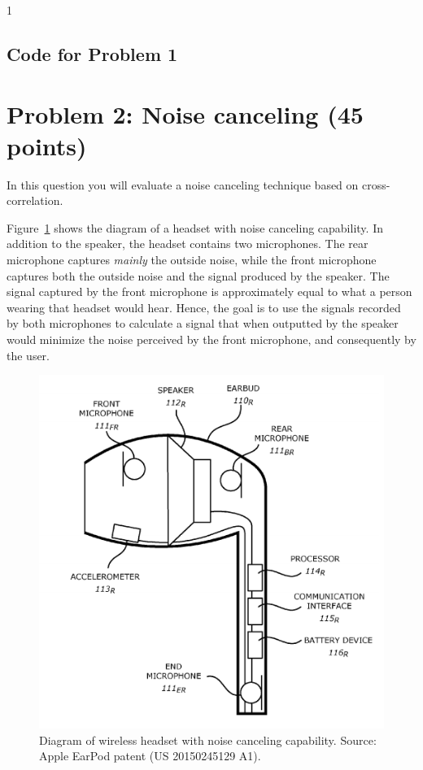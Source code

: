 \documentclass[10pt]{article}
\def\SOLUTIONS{1} %
\begin{document}
\if\SOLUTIONS1 
	\subsection*{Code for Problem 1}
	
\fi

\newpage
\section*{Problem 2: Noise canceling (45 points)}

In this question you will evaluate a noise canceling technique based on cross-correlation.

Figure~\ref{fig:earpod} shows the diagram of a headset with noise canceling capability. In addition to the speaker, the headset contains two microphones. The rear microphone captures \textit{mainly} the outside noise, while the front microphone captures both the outside noise and the signal produced by the speaker. The signal captured by the front microphone is approximately equal to what a person wearing that headset would hear. Hence, the goal is to use the signals recorded by both microphones to calculate a signal that when outputted by the speaker would minimize the noise perceived by the front microphone, and consequently by the user.

\FloatBarrier
\begin{figure}[h!]
	\centering
	\includegraphics[scale=0.7]{figs/apple_headphone.png}
	\caption{Diagram of wireless headset with noise canceling capability. Source: Apple EarPod patent (US 20150245129 A1).}
	\label{fig:earpod}
\end{figure}
\FloatBarrier
\end{document}
